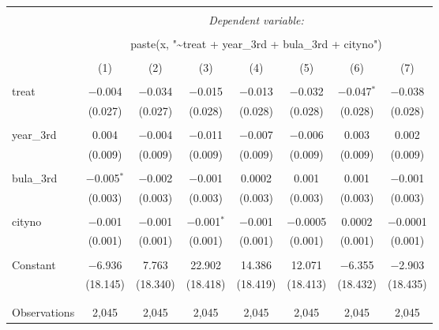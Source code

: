 
\begin{table}[!htbp] \centering 
  \caption{} 
  \label{} 
\begin{tabular}{@{\extracolsep{5pt}}lccccccc} 
\\[-1.8ex]\hline 
\hline \\[-1.8ex] 
 & \multicolumn{7}{c}{\textit{Dependent variable:}} \\ 
\cline{2-8} 
\\[-1.8ex] & \multicolumn{7}{c}{paste(x, "\textasciitilde treat + year\_3rd + bula\_3rd + cityno")} \\ 
\\[-1.8ex] & (1) & (2) & (3) & (4) & (5) & (6) & (7)\\ 
\hline \\[-1.8ex] 
 treat & $-$0.004 & $-$0.034 & $-$0.015 & $-$0.013 & $-$0.032 & $-$0.047$^{*}$ & $-$0.038 \\ 
  & (0.027) & (0.027) & (0.028) & (0.028) & (0.028) & (0.028) & (0.028) \\ 
  & & & & & & & \\ 
 year\_3rd & 0.004 & $-$0.004 & $-$0.011 & $-$0.007 & $-$0.006 & 0.003 & 0.002 \\ 
  & (0.009) & (0.009) & (0.009) & (0.009) & (0.009) & (0.009) & (0.009) \\ 
  & & & & & & & \\ 
 bula\_3rd & $-$0.005$^{*}$ & $-$0.002 & $-$0.001 & 0.0002 & 0.001 & 0.001 & $-$0.001 \\ 
  & (0.003) & (0.003) & (0.003) & (0.003) & (0.003) & (0.003) & (0.003) \\ 
  & & & & & & & \\ 
 cityno & $-$0.001 & $-$0.001 & $-$0.001$^{*}$ & $-$0.001 & $-$0.0005 & 0.0002 & $-$0.0001 \\ 
  & (0.001) & (0.001) & (0.001) & (0.001) & (0.001) & (0.001) & (0.001) \\ 
  & & & & & & & \\ 
 Constant & $-$6.936 & 7.763 & 22.902 & 14.386 & 12.071 & $-$6.355 & $-$2.903 \\ 
  & (18.145) & (18.340) & (18.418) & (18.419) & (18.413) & (18.432) & (18.435) \\ 
  & & & & & & & \\ 
\hline \\[-1.8ex] 
Observations & 2,045 & 2,045 & 2,045 & 2,045 & 2,045 & 2,045 & 2,045 \\ 

\end{tabular}
\end{table}
